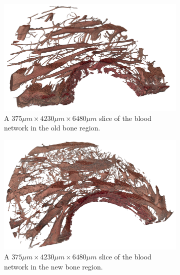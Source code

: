 \documentclass[pdflatex,sn-mathphys]{sn-jnl}%
\theoremstyle{thmstyleone}%
\theoremstyle{thmstyletwo}%
\theoremstyle{thmstylethree}%
\begin{document}
\begin{figure}
    \centering
    \begin{subfigure}[b]{\linewidth}
    \centering
        \includegraphics[width=.7\linewidth]{figures/blood_old_bone_100.png}
        \caption{A $375\mu m \times 4230\mu m \times 6480\mu m$ slice of the blood network in the old bone region.}
        \label{fig:blood-old-slice}
    \end{subfigure}
    \begin{subfigure}[b]{\linewidth}
    \centering      
        \includegraphics[width=.7\linewidth]{figures/blood_new_bone_100.png}
        \caption{A $375\mu m \times 4230\mu m \times 6480\mu m$ slice of the blood network in the new bone region.}
        \label{fig:blood-new-slice}
    \end{subfigure}
    \begin{subfigure}[b]{.48\linewidth}
    \centering      

\end{subfigure}
\end{figure}
\end{document}
